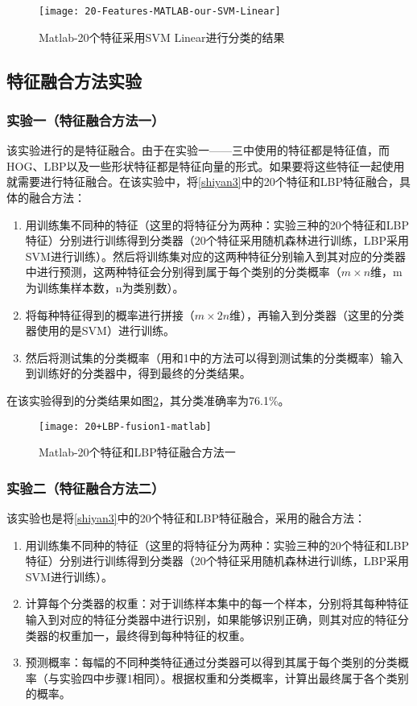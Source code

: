 \begin{figure}[!ht]
\centering
\texttt{[image: 20-Features-MATLAB-our-SVM-Linear]}
\caption{Matlab-20个特征采用SVM Linear进行分类的结果}
\label{fig:20-Features-MATLAB-our-SVM-Linear}
\end{figure}

\subsection{特征融合方法实验}
\subsubsection{实验一（特征融合方法一）}
\label{ronghe1}
该实验进行的是特征融合。由于在实验一——三中使用的特征都是特征值，而HOG、LBP以及一些形状特征都是特征向量的形式。如果要将这些特征一起使用就需要进行特征融合。在该实验中，将\ref{shiyan3}中的20个特征和LBP特征融合，具体的融合方法：
\begin{enumerate}
\item 用训练集不同种的特征（这里的将特征分为两种：实验三种的20个特征和LBP特征）分别进行训练得到分类器（20个特征采用随机森林进行训练，LBP采用SVM进行训练）。然后将训练集对应的这两种特征分别输入到其对应的分类器中进行预测，这两种特征会分别得到属于每个类别的分类概率（$m \times n$维，m为训练集样本数，n为类别数）。
\item 将每种特征得到的概率进行拼接（$m \times 2n$维），再输入到分类器（这里的分类器使用的是SVM）进行训练。
\item 然后将测试集的分类概率（用和1中的方法可以得到测试集的分类概率）输入到训练好的分类器中，得到最终的分类结果。
\end{enumerate}

在该实验得到的分类结果如图\ref{fig:20+LBP-fusion1-matlab}，其分类准确率为76.1\%。
\begin{figure}[!ht]
\centering
\texttt{[image: 20+LBP-fusion1-matlab]}
\caption{Matlab-20个特征和LBP特征融合方法一}
\label{fig:20+LBP-fusion1-matlab}
\end{figure}

\subsubsection{实验二（特征融合方法二）}
该实验也是将\ref{shiyan3}中的20个特征和LBP特征融合，采用的融合方法：
\begin{enumerate}
\item 用训练集不同种的特征（这里的将特征分为两种：实验三种的20个特征和LBP特征）分别进行训练得到分类器（20个特征采用随机森林进行训练，LBP采用SVM进行训练）。
\item 计算每个分类器的权重：对于训练样本集中的每一个样本，分别将其每种特征输入到对应的特征分类器中进行识别，如果能够识别正确，则其对应的特征分类器的权重加一，最终得到每种特征的权重。
\item 预测概率：每幅的不同种类特征通过分类器可以得到其属于每个类别的分类概率（与实验四中步骤1相同）。根据权重和分类概率，计算出最终属于各个类别的概率。
\end{enumerate}


